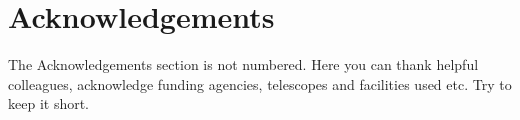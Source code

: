 \documentclass[fleqn,usenatbib]{mnras}
\begin{document}
\section*{Acknowledgements}

The Acknowledgements section is not numbered. Here you can thank helpful
colleagues, acknowledge funding agencies, telescopes and facilities used etc.
Try to keep it short.









\bsp	%
\label{lastpage}
\end{document}
